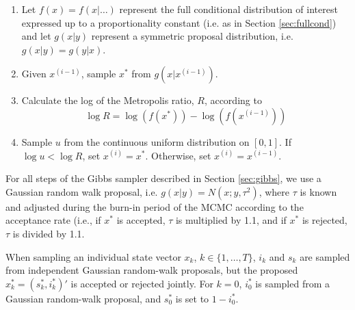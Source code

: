 \documentclass{article}
\begin{document}
\begin{enumerate}
\item Let $f(x) = f(x|\hdots)$ represent the full conditional distribution of interest expressed up to a proportionality constant (i.e. as in Section \ref{sec:fullcond}) and let $g(x|y)$ represent a symmetric proposal distribution, i.e. $g(x|y) = g(y|x)$.
\item Given $x^{(i-1)}$, sample $x^*$ from $g(x|x^{(i-1)})$.
\item Calculate the log of the Metropolis ratio, $R$, according to
\[\log R = \log\left(f(x^*)\right) - \log\left(f(x^{(i-1)})\right)\]
\item Sample $u$ from the continuous uniform distribution on $[0,1]$. If $\log u < \log R$, set $x^{(i)} = x^*$. Otherwise, set $x^{(i)} = x^{(i-1)}$.
\end{enumerate}

\noindent For all steps of the Gibbs sampler described in Section \ref{sec:gibbs}, we use a Gaussian random walk proposal, i.e. $g(x|y) = N(x;y,\tau^2)$, where $\tau$ is known and adjusted during the burn-in period of the MCMC according to the acceptance rate (i.e., if $x^*$ is accepted, $\tau$ is multiplied by 1.1, and if $x^*$ is rejected, $\tau$ is divided by 1.1.

When sampling an individual state vector $x_k$, $k \in \{1,\ldots,T\}$, $i_k$ and $s_k$ are sampled from independent Gaussian random-walk proposals, but the proposed $x^*_k = (s^*_k,i^*_k)'$ is accepted or rejected jointly. For $k = 0$, $i^*_0$ is sampled from a Gaussian random-walk proposal, and $s^*_0$ is set to $1 - i^*_0$.
\end{document}
